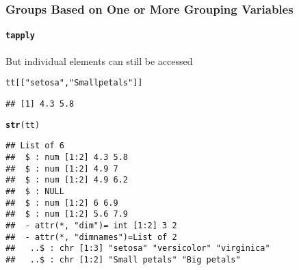 \documentclass[paper=screen,mathserif]{beamer}\usepackage[]{graphicx}\usepackage[]{color}
\makeatletter
\newcommand{\hlstr}[1]{\textcolor[rgb]{0.192,0.494,0.8}{#1}}%
\newcommand{\hlstd}[1]{\textcolor[rgb]{0.345,0.345,0.345}{#1}}%
\newcommand{\hlkwd}[1]{\textcolor[rgb]{0.737,0.353,0.396}{\textbf{#1}}}%
\newenvironment{kframe}{%
 \def\at@end@of@kframe{}%
 \ifinner\ifhmode%
  \def\at@end@of@kframe{\end{minipage}}%
  \begin{minipage}{\columnwidth}%
 \fi\fi%
 \def\FrameCommand##1{\hskip\@totalleftmargin \hskip-\fboxsep
 \colorbox{shadecolor}{##1}\hskip-\fboxsep
     \hskip-\linewidth \hskip-\@totalleftmargin \hskip\columnwidth}%
 \MakeFramed {\advance\hsize-\width
   \@totalleftmargin\z@ \linewidth\hsize
   \@setminipage}}%
 {\par\unskip\endMakeFramed%
 \at@end@of@kframe}
\newenvironment{knitrout}{}{} %
\newcommand{\ft}[1]{\frametitle{#1}}
\newcommand{\fst}[1]{\framesubtitle{#1}}
\makeatother
\begin{document}
\begin{frame}[fragile]
  \ft{Groups Based on One or More Grouping Variables}
  \fst{{\tt tapply}}

  But individual elements can still be accessed
\begin{knitrout}\scriptsize
{}\color{fgcolor}\begin{kframe}
\begin{alltt}
\hlstd{tt[[}\hlstr{"setosa"}\hlstd{,} \hlstr{"Small petals"}\hlstd{]]}
\end{alltt}
\begin{verbatim}
## [1] 4.3 5.8
\end{verbatim}
\end{kframe}
\end{knitrout}

\begin{knitrout}\scriptsize
{}\color{fgcolor}\begin{kframe}
\begin{alltt}
\hlkwd{str}\hlstd{(tt)}
\end{alltt}
\begin{verbatim}
## List of 6
##  $ : num [1:2] 4.3 5.8
##  $ : num [1:2] 4.9 7
##  $ : num [1:2] 4.9 6.2
##  $ : NULL
##  $ : num [1:2] 6 6.9
##  $ : num [1:2] 5.6 7.9
##  - attr(*, "dim")= int [1:2] 3 2
##  - attr(*, "dimnames")=List of 2
##   ..$ : chr [1:3] "setosa" "versicolor" "virginica"
##   ..$ : chr [1:2] "Small petals" "Big petals"
\end{verbatim}
\end{kframe}
\end{knitrout}

\end{frame}
\end{document}
